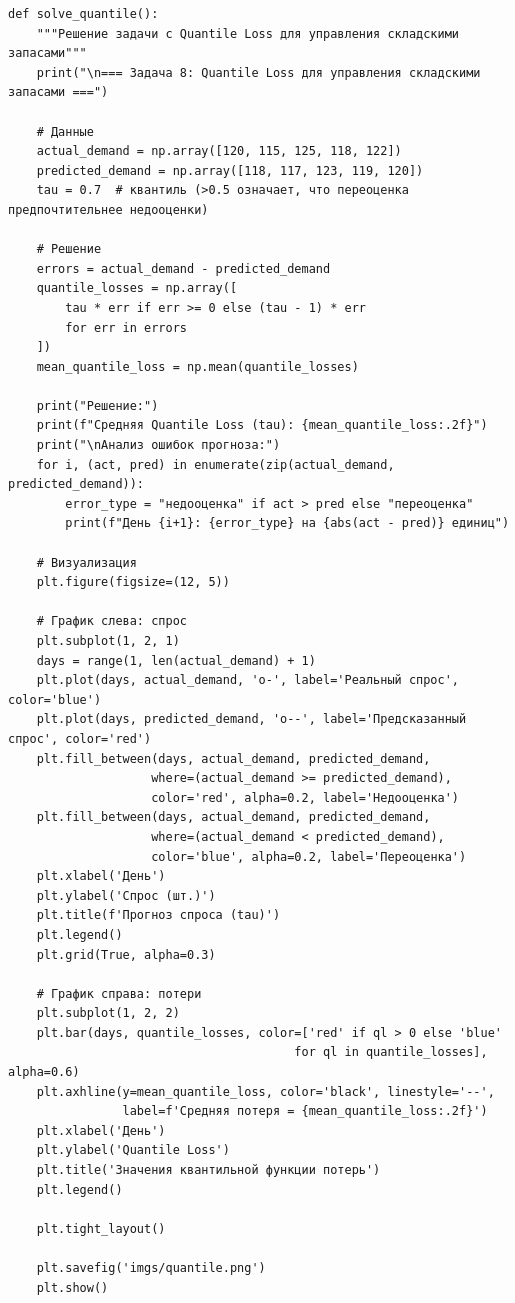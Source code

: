 \documentclass[12pt]{article}
\theoremstyle{definition}
\theoremstyle{definition}
\theoremstyle{definition}
\theoremstyle{remark}
\theoremstyle{remark}
\begin{document}
\begin{verbatim}
def solve_quantile():
    """Решение задачи с Quantile Loss для управления складскими запасами"""
    print("\n=== Задача 8: Quantile Loss для управления складскими запасами ===")
    
    # Данные
    actual_demand = np.array([120, 115, 125, 118, 122])
    predicted_demand = np.array([118, 117, 123, 119, 120])
    tau = 0.7  # квантиль (>0.5 означает, что переоценка предпочтительнее недооценки)
    
    # Решение
    errors = actual_demand - predicted_demand
    quantile_losses = np.array([
        tau * err if err >= 0 else (tau - 1) * err
        for err in errors
    ])
    mean_quantile_loss = np.mean(quantile_losses)
    
    print("Решение:")
    print(f"Средняя Quantile Loss (tau): {mean_quantile_loss:.2f}")
    print("\nАнализ ошибок прогноза:")
    for i, (act, pred) in enumerate(zip(actual_demand, predicted_demand)):
        error_type = "недооценка" if act > pred else "переоценка"
        print(f"День {i+1}: {error_type} на {abs(act - pred)} единиц")
    
    # Визуализация
    plt.figure(figsize=(12, 5))
    
    # График слева: спрос
    plt.subplot(1, 2, 1)
    days = range(1, len(actual_demand) + 1)
    plt.plot(days, actual_demand, 'o-', label='Реальный спрос', color='blue')
    plt.plot(days, predicted_demand, 'o--', label='Предсказанный спрос', color='red')
    plt.fill_between(days, actual_demand, predicted_demand, 
                    where=(actual_demand >= predicted_demand),
                    color='red', alpha=0.2, label='Недооценка')
    plt.fill_between(days, actual_demand, predicted_demand,
                    where=(actual_demand < predicted_demand),
                    color='blue', alpha=0.2, label='Переоценка')
    plt.xlabel('День')
    plt.ylabel('Спрос (шт.)')
    plt.title(f'Прогноз спроса (tau)')
    plt.legend()
    plt.grid(True, alpha=0.3)
    
    # График справа: потери
    plt.subplot(1, 2, 2)
    plt.bar(days, quantile_losses, color=['red' if ql > 0 else 'blue' 
                                        for ql in quantile_losses], alpha=0.6)
    plt.axhline(y=mean_quantile_loss, color='black', linestyle='--',
                label=f'Средняя потеря = {mean_quantile_loss:.2f}')
    plt.xlabel('День')
    plt.ylabel('Quantile Loss')
    plt.title('Значения квантильной функции потерь')
    plt.legend()
    
    plt.tight_layout()
    
    plt.savefig('imgs/quantile.png')
    plt.show()

\end{verbatim}
\end{document}
